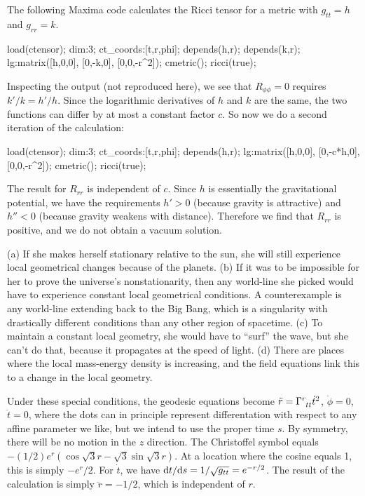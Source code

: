 The following Maxima code calculates the Ricci tensor for a metric with $g_{tt}=h$ and $g_{rr}=k$.

\begin{listing}{1}
load(ctensor);
dim:3;
ct_coords:[t,r,phi];
depends(h,r);
depends(k,r);
lg:matrix([h,0,0],
          [0,-k,0],
          [0,0,-r^2]);
cmetric();
ricci(true);
\end{listing}

\noindent Inspecting the output (not reproduced here), we see that $R_{\phi\phi}=0$ requires $k'/k=h'/h$. Since the logarithmic derivatives of $h$ and $k$ are the
same, the two functions can differ by at most a constant factor $c$. So now we do a second iteration of the calculation:

\begin{listing}{1}
load(ctensor);
dim:3;
ct_coords:[t,r,phi];
depends(h,r);
lg:matrix([h,0,0],
          [0,-c*h,0],
          [0,0,-r^2]);
cmetric();
ricci(true);
\end{listing}

\noindent The result for $R_{rr}$ is independent of $c$. Since $h$ is essentially the gravitational potential,
we have the requirements $h'>0$ (because gravity is attractive)
and $h''<0$ (because gravity weakens with distance). Therefore we find that  $R_{rr}$
is positive, and we do not obtain a vacuum solution.


(a) If she makes herself stationary relative to the sun, she will still experience local geometrical changes
because of the planets. (b) If it was to be impossible for her to prove the universe's nonstationarity,
then any world-line she picked would have to experience constant local geometrical conditions.
A counterexample is any world-line extending back to the Big Bang, which is a singularity with drastically
different conditions than any other region of spacetime.
(c) To maintain a constant local geometry, she would have to ``surf'' the wave, but
she can't do that, because it propagates at the speed of light. (d) There are places where the
local mass-energy density is increasing, and the field equations link this to a change in the local
geometry.


Under these special conditions, the geodesic equations become $\ddot{r}=\Gamma\indices{^r_{tt}}\dot{t}^2$,
$\ddot{\phi}=0$, $\ddot{t}=0$,
where the dots can in principle represent differentation with respect to any affine parameter we like, but
we intend to use the proper time $s$.
By symmetry, there will be no motion in the $z$ direction.
The Christoffel symbol equals $-(1/2)e^r(\cos\sqrt{3}r-\sqrt{3}\sin\sqrt{3}r)$. At a location where
the cosine equals 1, this is simply $-e^r/2$. For $\dot{t}$, we have $\textup{d} t/\textup{d} s=1/\sqrt{g_{tt}}=e^{-r/2}$.
The result of the calculation is simply $\ddot{r}=-1/2$, which is independent of $r$.

